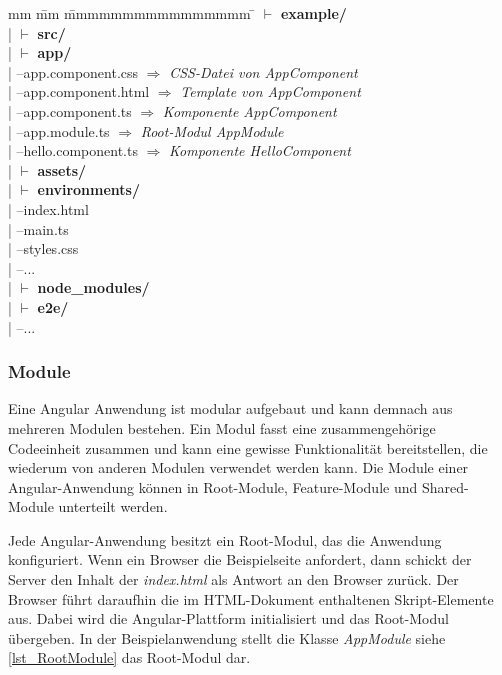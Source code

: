 \begin{tabbing}
	mm \= mm \= mmmmmmmmmmmmmmmm \= \kill
	$\vdash$ \textbf{example/} \\ 
	| \> $\vdash$ \textbf{src/}\\ 
	| \> \> $\vdash$  \textbf{app/}\\
	| \> \>  --app.component.css  $\Rightarrow$ \textit{CSS-Datei von AppComponent}\\ 
	| \> \>  --app.component.html  $\Rightarrow$ \textit{Template von AppComponent}\\
	| \> \>  --app.component.ts	 $\Rightarrow$ \textit{Komponente AppComponent}\\
	| \> \>  --app.module.ts  $\Rightarrow$ \textit{Root-Modul AppModule}\\
	| \> \>  --hello.component.ts  $\Rightarrow$ \textit{Komponente HelloComponent}\\
	| \> \> $\vdash$ \textbf{assets/} \\
	| \> \> $\vdash$ \textbf{environments/} \\
	| \> --index.html\\
	| \> --main.ts\\
	| \> --styles.css \\
	| \> --... \\
	| \> $\vdash$ \textbf{node\_modules/}\\ 
	| \> $\vdash$ \textbf{e2e/}\\   
	| --...\\
\end{tabbing}

\subsubsection{Module}
Eine Angular Anwendung ist modular aufgebaut und kann demnach aus mehreren Modulen bestehen. Ein Modul fasst eine zusammengehörige Codeeinheit zusammen und kann eine gewisse Funktionalität bereitstellen, die wiederum von anderen Modulen verwendet werden kann. \autocites[vgl.][103\psqq]{Steyer.2017}  Die Module einer Angular-Anwendung können in Root-Module, Feature-Module und Shared-Module unterteilt werden. 

Jede Angular-Anwendung besitzt ein Root-Modul, das die Anwendung konfiguriert. Wenn ein Browser die Beispielseite anfordert, dann schickt der Server den Inhalt der \textit{index.html} als Antwort an den Browser zurück. Der Browser führt daraufhin die im HTML-Dokument enthaltenen Skript-Elemente aus. Dabei wird die Angular-Plattform initialisiert und das Root-Modul übergeben. \autocites[vgl.][60]{Steyer.2017}[vgl.][226\psqq]{Freeman.2018} In der Beispielanwendung stellt die Klasse \textit{AppModule} siehe \autoref{lst_RootModule} das Root-Modul dar. 

